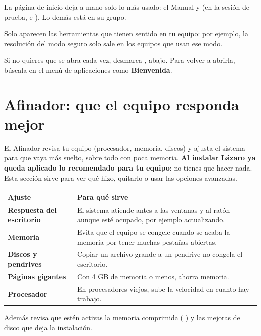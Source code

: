 La página de inicio deja a mano solo lo más usado: el Manual y
 (en la sesión de prueba, 
e ). Lo demás está en su grupo.

Solo aparecen las herramientas que tienen sentido en tu equipo: por
ejemplo, la resolución del modo seguro solo sale en los equipos que usan ese
modo.

Si no quieres que se abra cada vez, desmarca , abajo. Para volver a abrirla, búscala en el menú de
aplicaciones como \textbf{Bienvenida}.

\section{Afinador: que el equipo responda mejor}\label{sec:afinador}

El Afinador revisa tu equipo (procesador, memoria, discos) y ajusta el
sistema para que vaya más suelto, sobre todo con poca memoria. \textbf{Al
instalar Lázaro ya queda aplicado lo recomendado para tu equipo}: no tienes
que hacer nada. Esta sección sirve para ver qué hizo, quitarlo o usar las
opciones avanzadas.

\begin{center}
\begin{tabularx}{\textwidth}{>{\bfseries}lX}
\toprule
Ajuste & Para qué sirve \\
\midrule
Respuesta del escritorio & El sistema atiende antes a las ventanas y al
  ratón aunque esté ocupado, por ejemplo actualizando. \\
Memoria & Evita que el equipo se congele cuando se acaba la memoria por
  tener muchas pestañas abiertas. \\
Discos y pendrives & Copiar un archivo grande a un pendrive no congela el
  escritorio. \\
Páginas gigantes & Con 4 GB de memoria o menos, ahorra memoria. \\
Procesador & En procesadores viejos, sube la velocidad en cuanto hay
  trabajo. \\
\bottomrule
\end{tabularx}
\end{center}

Además revisa que estén activas la memoria comprimida (
\cite{zram}) y las mejoras de disco que deja la instalación.

